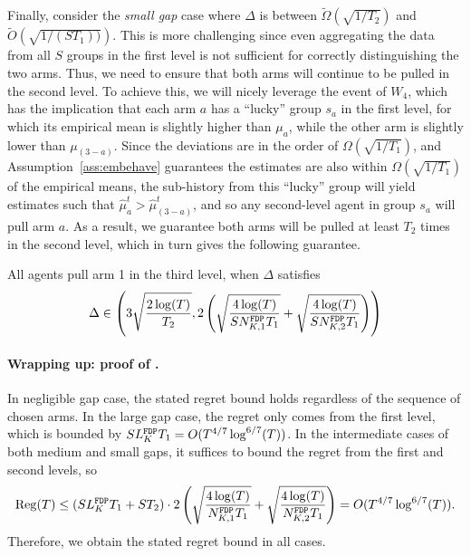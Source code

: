 Finally, consider the \emph{small gap} case where $\Delta$ is between
$\tilde\Omega(\sqrt{1/T_2})$ and $\tilde O(\sqrt{1/(S T_1))})$. This
is more challenging since even aggregating the data from all $S$
groups in the first level is not sufficient for correctly
distinguishing the two arms. Thus, we need to ensure that both arms
will continue to be pulled in the second level. To achieve this, we
will nicely leverage the event of $W_4$, which has the implication
that each arm $a$ has a ``lucky'' group $s_a$ in the first level,
for which its empirical mean is slightly higher than $\mu_a$, while
the other arm is slightly lower than $\mu_{(3-a)}$. Since the
deviations are in the order of $\Omega(\sqrt{1/T_1})$, and Assumption~\ref{ass:embehave} guarantees the estimates are also within $\Omega(\sqrt{1/T_1})$ of the empirical means, the sub-history
from this ``lucky'' group will yield estimates such that
$\hat \mu_a^t > \hat \mu_{(3-a)}^t$, and so any second-level agent in
group $s_a$ will pull arm $a$.  As a result, we guarantee both arms
will be pulled at least $T_2$ times in the second level, which in turn
gives the following guarantee.


\begin{lemma}\label{3levelsmallcase}
  All agents pull arm 1 in the third level, when $\Delta$ satisfies
  \[
    \Delta\in \left( 3\sqrt{\frac{2\log(T)}{T_2}},
      2\left(\sqrt{\frac{4\log(T)}{S \fdpN[1]T_1}} +
        \sqrt{\frac{4\log(T)}{S \fdpN[2]T_1}}\right) \right)
  \]
\end{lemma}


\paragraph{Wrapping up: proof of . } In negligible
gap case, the stated regret bound holds regardless of the sequence of
chosen arms. In the large gap case, the regret only comes from the
first level, which is bounded
by $S \GdT T_1 = O(T^{4/7} \log^{6/7}(T))$. In the intermediate cases of
both medium and small gaps, it suffices to bound the regret from the
first and second levels, so
\[
\reg(T) \leq (S \GdT T_1 + S T_2) \cdot 2\left(\sqrt{\frac{4\log(T)}{\fdpN[1]T_1}}
+ \sqrt{\frac{4\log(T)}{\fdpN[2]T_1}}\right) = O(T^{4/7} \log^{6/7}(T)).
\]
Therefore, we obtain the stated regret bound in all cases.




